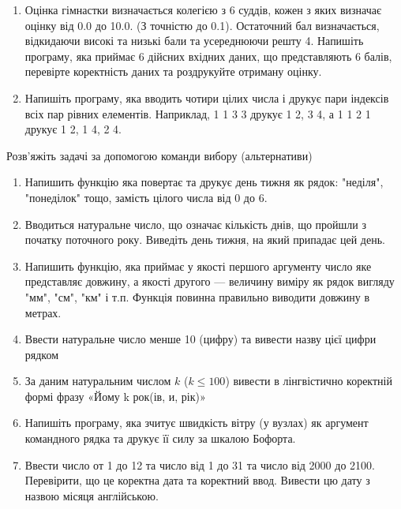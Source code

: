 \documentclass[]{article}
\begin{document}
\begin{enumerate}
\item Оцінка гімнастки визначається колегією з 6 суддів, кожен з яких визначає оцінку від 0.0 до 10.0. 
(З точністю до 0.1). Остаточний бал визначається, відкидаючи високі та низькі бали та усереднюючи решту 4.
Напишіть програму, яка приймає 6 дійсних вхідних даних, що представляють 6 балів,
перевірте коректність даних та роздрукуйте отриману оцінку.

\item
Напишіть програму, яка вводить чотири цілих числа і 
друкує пари індексів всіх пар рівних елементів. Наприклад, 1 1 3 3 друкує 1 2, 3 4, а 1 1 2 1 друкує 1 2, 1 4, 2 4.

 \end{enumerate}

Розв'яжіть задачі за допомогою команди вибору (альтернативи)
\begin{enumerate}
\item Напишить функцію яка повертає та друкує день тижня як рядок: "неділя",
"понеділок" тощо, замість цілого числа від 0 до 6.
\item
Вводиться натуральне число, що означає кількість днів, що пройшли з
початку поточного року. Виведіть день тижня, на який припадає цей день.
\item
Напишить функцію, яка приймає у якості першого аргументу число яке представляє довжину, 
а якості другого --- величину виміру як рядок вигляду "мм", "см", "км" і т.п. 
Функція повинна правильно виводити довжину в метрах.
\item
Ввести натуральне число менше 10 (цифру) та вивести назву цієї цифри
рядком
\item
За даним натуральним числом $k$ ($k \le 100$) вивести в лінгвістично коректній
формі фразу «Йому k рок(ів, и, рік)»
\item Напишіть програму, яка зчитує швидкість вітру (у вузлах) як аргумент командного рядка та друкує її силу за шкалою Бофорта.

\item Ввести число от 1  до 12 та число від 1 до 31 та число від 2000 до 2100. Перевірити, що це коректна дата та коректний ввод. Вивести цю дату з назвою місяця англійською.

\end{enumerate}
\end{document}
